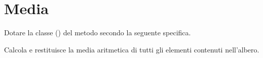 \section{Media}
Dotare la classe  () del metodo  secondo la seguente specifica.

\begin{methodslist}

 {
Calcola e restituisce la media aritmetica di tutti gli elementi contenuti nell'albero.
}

\end{methodslist}